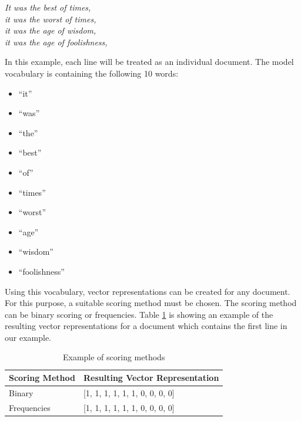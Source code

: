 \textit{
\centering	
It was the best of times,\\
it was the worst of times,\\
it was the age of wisdom,\\
it was the age of foolishness, \\
}

In this example, each line will be treated as an individual document. The model vocabulary is containing the following 10 words:
\begin{itemize}
	\item “it”
	\item “was”
	\item “the”
	\item “best”
	\item “of”
	\item “times”
	\item “worst”
	\item “age”
	\item “wisdom”
	\item “foolishness”
\end{itemize}

Using this vocabulary, vector representations can be created for any document. For this purpose, a suitable scoring method must be chosen. The scoring method can be binary scoring or frequencies. Table \ref{tab:scoring} is showing an example of the resulting vector representations for a document which contains the first line in our example.

\begin{table}[H]
	\centering
	\begin{tabular}{ll}
		\hline
		\textbf{Scoring Method} & \textbf{Resulting Vector Representation}                                         \\ \hline
		Binary & [1, 1, 1, 1, 1, 1, 0, 0, 0, 0] \\ \hline
		Frequencies & [1, 1, 1, 1, 1, 1, 0, 0, 0, 0] \\ \hline
	\end{tabular}
	\caption{Example of scoring methods}
	\label{tab:scoring}
\end{table}

